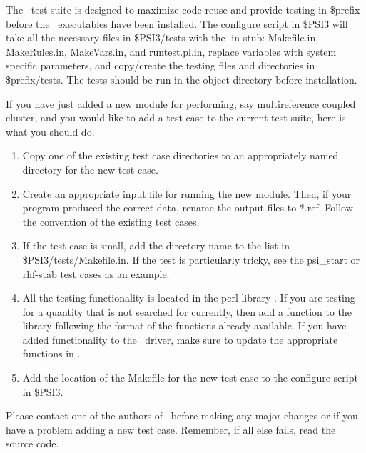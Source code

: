The \PSIthree\ test suite is designed to maximize code reuse and
provide testing in \$prefix before the \PSIthree\
executables have been installed. The configure script in \$PSI3 
will take all the necessary files in \$PSI3/tests
with the .in stub: Makefile.in, MakeRules.in, MakeVars.in,
and runtest.pl.in, replace variables with system specific parameters,
and copy/create the testing files and directories in \$prefix/tests.
The tests should be run in the object directory before installation.

If you have just added a new module for performing, say multireference 
coupled cluster, and you would like to add a test case to the current 
test suite, here is what you should do.  
\begin{enumerate}
\item Copy one of the existing test case directories to an 
      appropriately named directory for the new test case.

\item Create an appropriate input file for running the new module. 
      Then, if your program produced the correct data, rename
      the output files to *.ref. Follow the convention of the 
      existing test cases.

\item If the test case is small, add the directory name to the list
      in \$PSI3/tests/Makefile.in.  If the test is particularly tricky,
      see the psi\_start or rhf-stab test cases as an example.

\item All the testing functionality is located in the perl library
      \file{runtest.pl.in}. If you are testing for a quantity that
      is not searched for currently, then add a function to the 
      library following the format of the functions already available.
      If you have added functionality to the \PSIthree\ driver,
      make sure to update the appropriate functions in .

\item Add the location of the Makefile for the new test case
      to the configure script in \$PSI3.

\end{enumerate}

Please contact one of the authors of \PSIthree\ before making any
major changes or if you have a problem adding a new test case.
Remember, if all else fails, read the source code.

